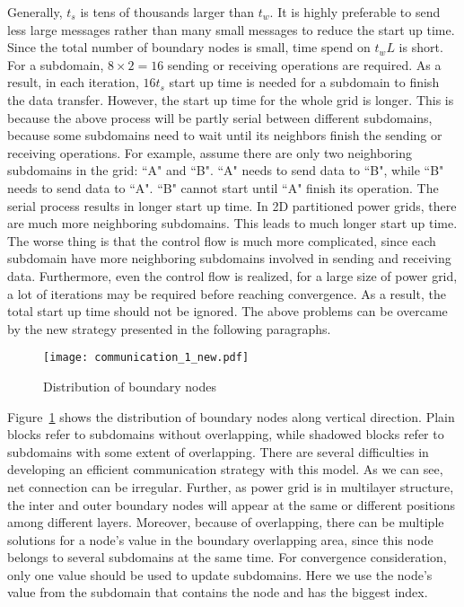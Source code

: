 \documentclass{sig-alternate}
\begin{document}
	Generally, $t_s$ is tens of thousands larger than $t_w$. It is highly preferable to send less 
	large messages rather than many small messages to reduce the start up time. Since the total number of boundary nodes is small, 
	time spend on $t_wL$ is short. For a subdomain, $8\times 2 = 
	16$ sending or receiving operations are required. As a result, in each iteration, $16t_s$ start up time is
	needed for a subdomain to finish the data transfer. However, the start up time for the whole grid is longer.
	This is because the above process will be partly serial between different subdomains, because some subdomains need to wait until
	its neighbors finish the sending or receiving operations. For example, 
	assume there are only two neighboring subdomains in the grid: ``A" and ``B". ``A" needs to send data to ``B", while ``B" needs
	to send data to ``A". ``B" cannot start until ``A" finish its operation. The serial process results in 
	longer start up time. In 2D partitioned power grids, there are much more neighboring subdomains. This leads to much 
	longer start up time. The worse thing is that the control flow is much more complicated, since each subdomain have more 
	neighboring subdomains involved in sending and receiving data. Furthermore, even the control flow is realized, for a large size of
	power grid, a lot of iterations may be required before reaching convergence. As a result, the total start up time should not be 
	ignored. The above problems can be overcame by the new strategy presented in the following paragraphs.

	\begin{figure}[htbp]
	  \centering
	  \texttt{[image: communication\_1\_new.pdf]}
	  \caption{Distribution of boundary nodes}
	  \label{comm}
	\end{figure}

	Figure~\ref{comm} shows the distribution of boundary nodes along vertical direction. Plain blocks refer to subdomains without 
	overlapping, while shadowed blocks refer to subdomains with some extent of overlapping. There are several difficulties in 
	developing an efficient communication strategy with this model. As we can see, net connection can be irregular. Further, 
	as power grid is in multilayer 
	structure, the inter and outer boundary nodes will appear at the same or different positions
	among different layers. Moreover, because of overlapping, there can be multiple solutions for a node's value in the boundary 
	overlapping area, since this node belongs to several subdomains at the same time. For convergence consideration, only one value 
	should be used to update subdomains. Here we use the node's value from the subdomain that contains the node and has the biggest 
	index.
\end{document}

